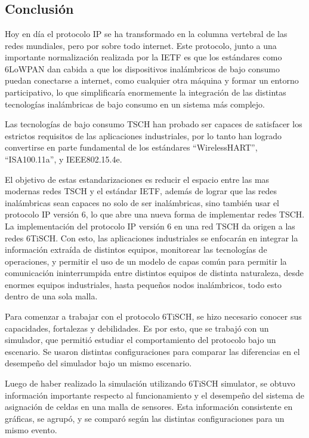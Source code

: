 \chapter[]{}
\label{ch:conclu}

\section{Conclusión}

Hoy en día el protocolo IP se ha transformado en la columna vertebral de las redes mundiales, pero por sobre todo internet. Este protocolo, junto a una importante normalización realizada por la IETF es que los estándares como 6LoWPAN dan cabida a que los dispositivos inalámbricos de bajo consumo puedan conectarse a internet, como cualquier otra máquina y formar un entorno participativo, lo que simplificaría enormemente la integración de las distintas tecnologías inalámbricas de bajo consumo en un sistema más complejo.

Las tecnologías de bajo consumo TSCH han probado ser capaces de satisfacer los estrictos requisitos de las aplicaciones industriales, por lo tanto han logrado convertirse en parte fundamental de los estándares “WirelessHART”, “ISA100.11a”, y IEEE802.15.4e.

El objetivo de estas estandarizaciones es reducir el espacio entre las mas modernas redes TSCH y el estándar IETF, además de lograr que las redes inalámbricas sean capaces no solo de ser inalámbricas, sino también usar el protocolo IP versión 6, lo que abre una nueva forma de implementar redes TSCH. La implementación del protocolo IP versión 6 en una red TSCH da origen a las redes 6TiSCH. Con esto, las aplicaciones industriales se enfocarán en integrar la información extraída de distintos equipos, monitorear las tecnologías de operaciones, y permitir el uso de un modelo de capas común para permitir la comunicación ininterrumpida entre distintos equipos de distinta naturaleza, desde enormes equipos industriales, hasta pequeños nodos inalámbricos, todo esto dentro de una sola malla.

Para comenzar a trabajar con el protocolo 6TiSCH, se hizo necesario conocer sus capacidades, fortalezas y debilidades. Es por esto, que se trabajó con un simulador, que permitió estudiar el comportamiento del protocolo bajo un escenario. Se usaron distintas configuraciones para comparar las diferencias en el desempeño del simulador bajo un mismo escenario.

Luego de haber realizado la simulación utilizando 6TiSCH simulator, se obtuvo información importante respecto al funcionamiento y el desempeño del sistema de asignación de celdas en una malla de sensores. Esta información consistente en gráficas, se agrupó, y se comparó según las distintas configuraciones para un mismo evento.


